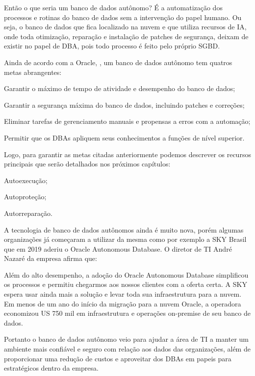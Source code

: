 Então o que seria um banco de dados autônomo? É a automatização dos processos e rotinas do banco de dados sem a intervenção do papel humano. Ou seja, o banco de dados que fica localizado na nuvem e que utiliza recursos de IA, onde toda otimização, reparação e instalação de patches de segurança, deixam de existir no papel de DBA, pois todo processo é feito pelo próprio SGBD.


Ainda de acordo com a Oracle, \cite{OracleDataBase}, um banco de dados autônomo tem quatros metas abrangentes:
\begin{alineas}
\item Garantir o máximo de tempo de atividade e desempenho do banco de dados;
\item Garantir a segurança máxima do banco de dados, incluindo patches e correções;
\item Eliminar tarefas de gerenciamento manuais e propensas a erros com a automação;
\item Permitir que os DBAs apliquem seus conhecimentos a funções de nível superior.
\end{alineas}


Logo, para garantir as metas citadas anteriormente podemos descrever os recursos principais que serão detalhados nos próximos capítulos:

\begin{alineas}
\item Autoexecução;
\item Autoproteção;
\item Autorreparação.
\end{alineas}


A tecnologia de banco de dados autônomos ainda é muito nova, porém algumas organizações já começaram a utilizar da mesma como por exemplo a SKY Brasil que em 2019 aderiu o Oracle Autonomous Database. O diretor de TI André Nazaré da empresa afirma que:  

\begin{citacao}
Além do alto desempenho, a adoção do Oracle Autonomous Database simplificou os processos e permitiu chegarmos aos nossos clientes com a oferta certa. A SKY espera usar ainda mais a solução e levar toda sua infraestrutura para a nuvem. Em menos de um ano do início da migração para a nuvem Oracle, a operadora economizou US 750 mil em infraestrutura e operações on-premise de seu banco de dados.\cite[p. ~34]{Sky}
\end{citacao}


Portanto o banco de dados autônomo veio para ajudar a área de TI a manter um ambiente mais confiável e seguro com relação aos dados das organizações, além de proporcionar uma redução de custos e aproveitar dos DBAs em papeis para estratégicos dentro da empresa.



